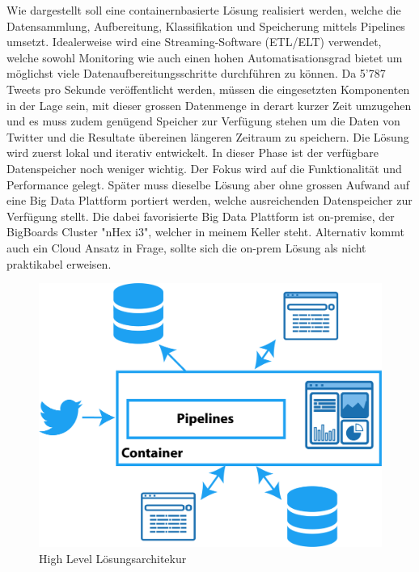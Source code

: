 Wie dargestellt soll eine containernbasierte L{\"o}sung realisiert werden, welche die Datensammlung, Aufbereitung, Klassifikation und Speicherung mittels Pipelines umsetzt. Idealerweise wird eine Streaming-Software (ETL/ELT) verwendet, welche sowohl Monitoring wie auch einen hohen Automatisationsgrad bietet um m{\"o}glichst viele Datenaufbereitungsschritte durchf{\"u}hren zu k{\"o}nnen. Da 5'787 Tweets pro Sekunde ver{\"o}ffentlicht werden, m{\"u}ssen die eingesetzten  Komponenten in der Lage sein, mit dieser grossen Datenmenge in derart kurzer Zeit umzugehen und es muss  zudem gen{\"u}gend Speicher zur Verf{\"u}gung stehen um die Daten von Twitter und die Resultate {\"u}bereinen l{\"a}ngeren Zeitraum zu speichern. Die L{\"o}sung wird zuerst lokal und iterativ entwickelt. In dieser Phase ist der verf{\"u}gbare Datenspeicher noch weniger wichtig. Der Fokus wird auf die Funktionalit{\"a}t und Performance gelegt. Sp{\"a}ter muss dieselbe L{\"o}sung aber ohne grossen Aufwand auf eine Big Data Plattform portiert werden, welche ausreichenden Datenspeicher zur Verf{\"u}gung stellt. Die dabei favorisierte Big Data Plattform ist on-premise, der BigBoards Cluster "nHex i3", welcher in meinem Keller steht. Alternativ kommt auch ein Cloud Ansatz in Frage, sollte sich die on-prem L{\"o}sung als nicht praktikabel erweisen. 


\begin{figure}[H]
	\centering
		\includegraphics[scale=0.4 ]{images/architecktur_high_level_ohne.png}
	\caption{High Level L{\"o}sungsarchitekur}
	\label{fig:high_level_architecture}
\end{figure}
